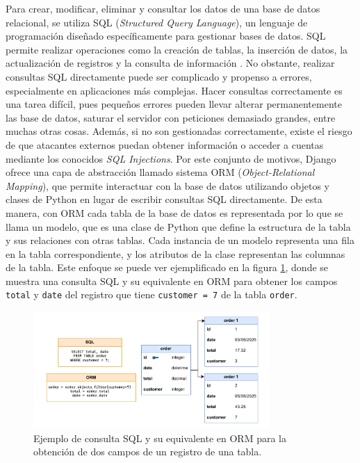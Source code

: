 Para crear, modificar, eliminar y consultar los datos de una base de datos relacional, se utiliza SQL (\textit{Structured Query Language}), un lenguaje de programación diseñado específicamente para gestionar bases de datos. SQL permite realizar operaciones como la creación de tablas, la inserción de datos, la actualización de registros y la consulta de información \cite{aws_sql}. No obstante, realizar consultas SQL directamente puede ser complicado y propenso a errores, especialmente en aplicaciones más complejas. Hacer consultas correctamente es una tarea difícil, pues pequeños errores pueden llevar alterar permanentemente las base de datos, saturar el servidor con peticiones demasiado grandes, entre muchas otras cosas. Además, si no son gestionadas correctamente, existe el riesgo de que atacantes externos puedan obtener información o acceder a cuentas mediante los conocidos \textit{SQL Injections}. Por este conjunto de motivos, Django ofrece una capa de abstracción llamado sistema ORM (\textit{Object-Relational Mapping}), que permite interactuar con la base de datos utilizando objetos y clases de Python en lugar de escribir consultas SQL directamente. De esta manera, con ORM cada tabla de la base de datos es representada por lo que se llama un modelo, que es una clase de Python que define la estructura de la tabla y sus relaciones con otras tablas. Cada instancia de un modelo representa una fila en la tabla correspondiente, y los atributos de la clase representan las columnas de la tabla. Este enfoque se puede ver ejemplificado en la figura \ref{fig:orm_vs_sql}, donde se muestra una consulta SQL y su equivalente en ORM para obtener los campos \texttt{total} y \texttt{date} del registro que tiene \texttt{customer = 7} de la tabla \texttt{order}.

\begin{figure}[H]
    \centering
    \includegraphics[width=0.8\textwidth]{figures/theoric_frame/orm_vs_sql.pdf}
    \caption{Ejemplo de consulta SQL y su equivalente en ORM para la obtención de dos campos de un registro de una tabla.}
    \label{fig:orm_vs_sql}
\end{figure}

